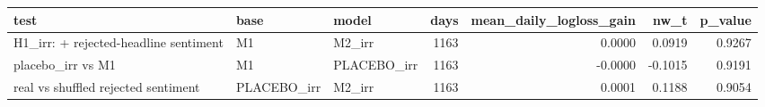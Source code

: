 \begin{tabular}{lllrrrr}
\toprule
test & base & model & days & mean\_daily\_logloss\_gain & nw\_t & p\_value \\
\midrule
H1\_irr: + rejected-headline sentiment & M1 & M2\_irr & 1163 & 0.0000 & 0.0919 & 0.9267 \\
placebo\_irr vs M1 & M1 & PLACEBO\_irr & 1163 & -0.0000 & -0.1015 & 0.9191 \\
real vs shuffled rejected sentiment & PLACEBO\_irr & M2\_irr & 1163 & 0.0001 & 0.1188 & 0.9054 \\
\bottomrule
\end{tabular}
